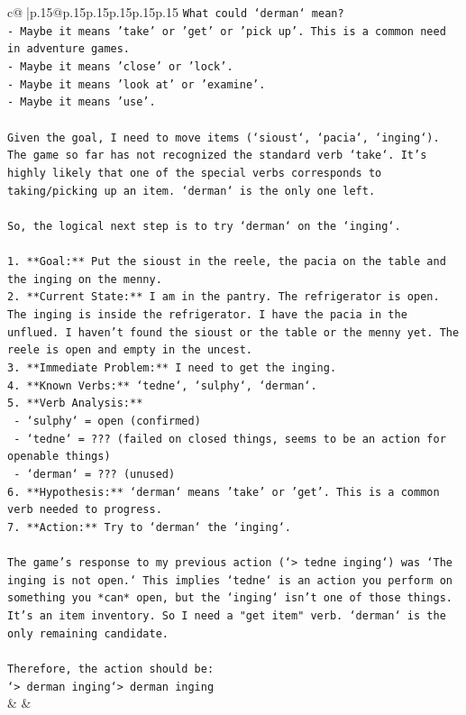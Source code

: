\documentclass{article}
\begin{document}
{\begin{supertabular}{c@{$\;$}|p{.15\linewidth}@{}p{.15\linewidth}p{.15\linewidth}p{.15\linewidth}p{.15\linewidth}p{.15\linewidth}}
{{{\texttt{What could `derman` mean?} \\
\texttt{{-} Maybe it means 'take' or 'get' or 'pick up'. This is a common need in adventure games.} \\
\texttt{{-} Maybe it means 'close' or 'lock'.} \\
\texttt{{-} Maybe it means 'look at' or 'examine'.} \\
\texttt{{-} Maybe it means 'use'.} \\
\\ 
\texttt{Given the goal, I need to move items (`sioust`, `pacia`, `inging`). The game so far has not recognized the standard verb `take`. It's highly likely that one of the special verbs corresponds to taking/picking up an item. `derman` is the only one left.} \\
\\ 
\texttt{So, the logical next step is to try `derman` on the `inging`.} \\
\\ 
\texttt{1.  **Goal:** Put the sioust in the reele, the pacia on the table and the inging on the menny.} \\
\texttt{2.  **Current State:** I am in the pantry. The refrigerator is open. The inging is inside the refrigerator. I have the pacia in the unflued. I haven't found the sioust or the table or the menny yet. The reele is open and empty in the uncest.} \\
\texttt{3.  **Immediate Problem:** I need to get the inging.} \\
\texttt{4.  **Known Verbs:** `tedne`, `sulphy`, `derman`.} \\
\texttt{5.  **Verb Analysis:**} \\
\texttt{    {-} `sulphy` = open (confirmed)} \\
\texttt{    {-} `tedne` = ??? (failed on closed things, seems to be an action for openable things)} \\
\texttt{    {-} `derman` = ??? (unused)} \\
\texttt{6.  **Hypothesis:** `derman` means 'take' or 'get'. This is a common verb needed to progress.} \\
\texttt{7.  **Action:** Try to `derman` the `inging`.} \\
\\ 
\texttt{The game's response to my previous action (`> tedne inging`) was `The inging is not open.` This implies `tedne` is an action you perform on something you *can* open, but the `inging` isn't one of those things. It's an item inventory. So I need a "get item" verb. `derman` is the only remaining candidate.} \\
\\ 
\texttt{Therefore, the action should be:} \\
\texttt{`> derman inging`> derman inging} \\
            }
        }
    }
    & & \\ \\


\end{supertabular}}
\end{document}
